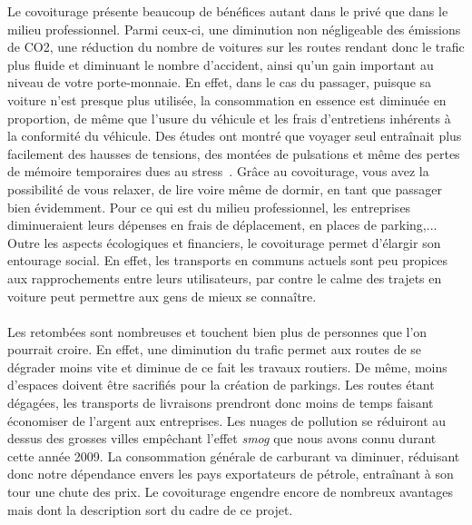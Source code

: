 \documentclass[12pt, a4paper, oneside]{article}
\begin{document}
    \indent Le covoiturage présente beaucoup de bénéfices autant dans le privé que dans le milieu professionnel. Parmi ceux-ci, une diminution non négligeable des émissions de CO2, une réduction du nombre de voitures sur les routes rendant donc le trafic plus fluide et diminuant le nombre d'accident, ainsi qu'un gain important au niveau de votre porte-monnaie. En effet, dans le cas du passager, puisque sa voiture n'est presque plus utilisée, la consommation en essence est diminuée en proportion, de même que l'usure du véhicule et les frais d'entretiens inhérents à la conformité du véhicule. Des études ont montré que voyager seul entraînait plus facilement des hausses de tensions, des montées de pulsations et même des pertes de mémoire temporaires dues au stress~\cite{health-study}. Grâce au covoiturage, vous avez la possibilité de vous relaxer, de lire voire même de dormir, en tant que passager bien évidemment. Pour ce qui est du milieu professionnel, les entreprises diminueraient leurs dépenses en frais de déplacement, en places de parking,... Outre les aspects écologiques et financiers, le covoiturage permet d'élargir son entourage social. En effet, les transports en communs actuels sont peu propices aux rapprochements entre leurs utilisateurs, par contre le calme des trajets en voiture peut permettre aux gens de mieux se connaître.\\\\
    \indent Les retombées sont nombreuses et touchent bien plus de personnes que l'on pourrait croire. En effet, une diminution du trafic permet aux routes de se dégrader moins vite et diminue de ce fait les travaux routiers. De même, moins d'espaces doivent être sacrifiés pour la création de parkings. Les routes étant dégagées, les transports de livraisons prendront donc moins de temps faisant économiser de l'argent aux entreprises. Les nuages de pollution se réduiront au dessus des grosses villes empêchant l'effet \textit{smog} que nous avons connu durant cette année 2009. La consommation générale de carburant va diminuer, réduisant donc notre dépendance envers les pays exportateurs de pétrole, entraînant à son tour une chute des prix. Le covoiturage engendre encore de nombreux avantages mais dont la description sort du cadre de ce projet.\\\\
\end{document}
